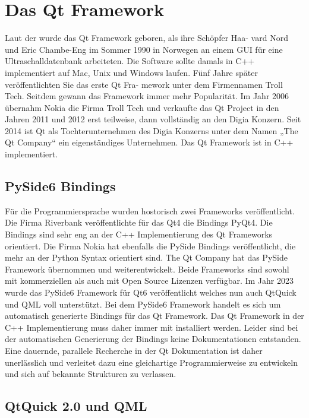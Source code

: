 \section{Das Qt Framework}

Laut der \cite[Qt Wiki Website]{qtWikiHistory} wurde das Qt Framework geboren, als ihre Schöpfer Haa-
vard Nord und Eric Chambe-Eng im Sommer 1990 in Norwegen an einem GUI für eine
Ultraschalldatenbank arbeiteten. Die Software sollte damals in C++ implementiert auf
Mac, Unix und Windows laufen. Fünf Jahre später veröffentlichten Sie das erste Qt Fra-
mework unter dem Firmennamen Troll Tech. Seitdem gewann das Framework immer
mehr Popularität. Im Jahr 2006 übernahm Nokia die Firma Troll Tech und verkaufte das
Qt Project in den Jahren 2011 und 2012 erst teilweise, dann vollständig an den Digia
Konzern. Seit 2014 ist Qt als Tochterunternehmen des Digia Konzerns unter dem Namen
„The Qt Company“ ein eigenständiges Unternehmen.
Das Qt Framework ist in C++ implementiert.

\subsection{PySide6 Bindings}

Für die Programmiersprache wurden hostorisch zwei Frameworks veröffentlicht. Die Firma Riverbank veröffentlichte für das Qt4 die Bindings PyQt4.
Die Bindings sind sehr eng an der C++ Implementierung des Qt Frameworks orientiert.
Die Firma Nokia hat ebenfalls die PySide Bindings veröffentlicht, die mehr an der Python Syntax orientiert sind.
The Qt Company hat das PySide Framework übernommen und weiterentwickelt. 
Beide Frameworks sind sowohl mit kommerziellen als auch mit Open Source Lizenzen verfügbar.
Im Jahr 2023 wurde das PySide6 Framework für Qt6 veröffentlicht welches nun auch QtQuick und QML voll unterstützt. 
Bei dem PySide6 Framework handelt es sich um automatisch generierte Bindings für das Qt Framework. 
Das Qt Framework in der C++ Implementierung muss daher immer mit installiert werden. 
Leider sind bei der automatischen Generierung der Bindings keine Dokumentationen entstanden.
Eine dauernde, parallele Recherche in der Qt Dokumentation ist daher unerlässlich und verleitet dazu eine gleichartige
Programmierweise zu entwickeln und sich auf bekannte Strukturen zu verlassen.

\subsection{QtQuick 2.0 und QML}

